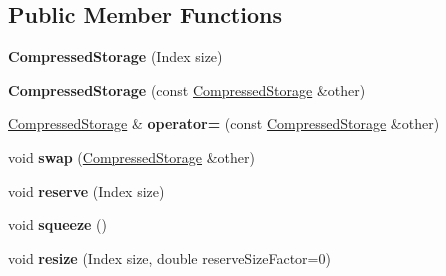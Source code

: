 \subsection*{Public Member Functions}
\begin{DoxyCompactItemize}
\item 
\mbox{\label{class_eigen_1_1internal_1_1_compressed_storage_a259255414bcca5b0f874422b814adcd8}} 
{\bfseries Compressed\+Storage} (Index size)
\item 
\mbox{\label{class_eigen_1_1internal_1_1_compressed_storage_a58e4d0458b53f8261fbb6547ae2c5cb7}} 
{\bfseries Compressed\+Storage} (const \mbox{\hyperlink{class_eigen_1_1internal_1_1_compressed_storage}{Compressed\+Storage}} \&other)
\item 
\mbox{\label{class_eigen_1_1internal_1_1_compressed_storage_a76413b8626d4ef2bd1681cbfb7d16dbd}} 
\mbox{\hyperlink{class_eigen_1_1internal_1_1_compressed_storage}{Compressed\+Storage}} \& {\bfseries operator=} (const \mbox{\hyperlink{class_eigen_1_1internal_1_1_compressed_storage}{Compressed\+Storage}} \&other)
\item 
\mbox{\label{class_eigen_1_1internal_1_1_compressed_storage_ab767a66ceffd14d21475675eb4f6fb23}} 
void {\bfseries swap} (\mbox{\hyperlink{class_eigen_1_1internal_1_1_compressed_storage}{Compressed\+Storage}} \&other)
\item 
\mbox{\label{class_eigen_1_1internal_1_1_compressed_storage_a1c32b23ec703d56e9087ae378f96c311}} 
void {\bfseries reserve} (Index size)
\item 
\mbox{\label{class_eigen_1_1internal_1_1_compressed_storage_aa8809423ddf2e140945668acecc32ad5}} 
void {\bfseries squeeze} ()
\item 
\mbox{\label{class_eigen_1_1internal_1_1_compressed_storage_ab303161d4a86c4b562b1d604025dafbd}} 
void {\bfseries resize} (Index size, double reserve\+Size\+Factor=0)
\item 

\end{DoxyCompactItemize}
